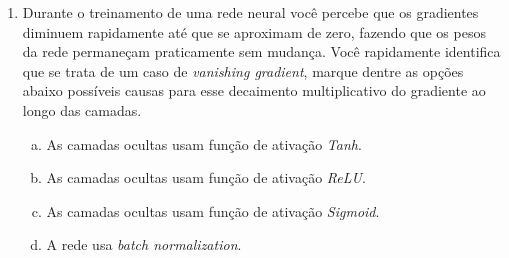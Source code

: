 \documentclass{dlproblemset}
\begin{document}
\begin{enumerate}[1)]
    \begin{enumerate}[(a)]
        \item ReLU: $f(x_{i}) = max(0,x_{i})$
        \item Sigmoid: $f(x_{i}) = \frac{1}{1 + e^{-x_{i}}}$
        \item Tanh: $f(x_{i}) = \frac{2}{1 + e^{-2x_{i}}}-1$
        \item Softplus: $f(x_{i}) = \log_{e}(1 + e^{x_{i}})$
        \item Softmax $f(x_{i}) = \frac{e^{x_{i}}}{\sum_{z} e^{x_{z}}}$
        \item Linear $f(x_{i}) = x_{i}$
	    \item \textit{Binary Cross Entropy Loss}: $L_{\text{bce}} = -(ylog(\hat{y}) + (1 - y)log(1-\hat{y}))$.
	    \item \textit{Categorical Cross Entropy Loss}: $L_{\text{cce}} = - \sum_{i=1}^{c}y_{i}\log\hat{y}_{i}$
	    \item \textit{Sum of Squared Residuals}: $L_{\text{ssr}} = (y - \hat{y})^{2}$.
	    \item \textit{Absolute Error Loss}: $L_{\text{abs}} = \left |y - \hat{y}\right|$.
	    \item \textit{Zero-One Loss}: $L_{01} = I(y \neq \hat{y})$.
    \end{enumerate}

    \item Durante o treinamento de uma rede neural você percebe que os gradientes diminuem rapidamente até que se aproximam de zero, fazendo que os pesos da rede permaneçam praticamente sem mudança. Você rapidamente identifica que se trata de um caso de \textit{vanishing gradient}, marque dentre as opções abaixo possíveis causas para esse decaimento multiplicativo do gradiente ao longo das camadas.

	\begin{enumerate}[(a)]
	    \item As camadas ocultas usam função de ativação \textit{Tanh}.
	    \item As camadas ocultas usam função de ativação \textit{ReLU}.
	    \item As camadas ocultas usam função de ativação \textit{Sigmoid}.
	    \item A rede usa \textit{batch normalization}.
	\end{enumerate}


\end{enumerate}
\end{document}
